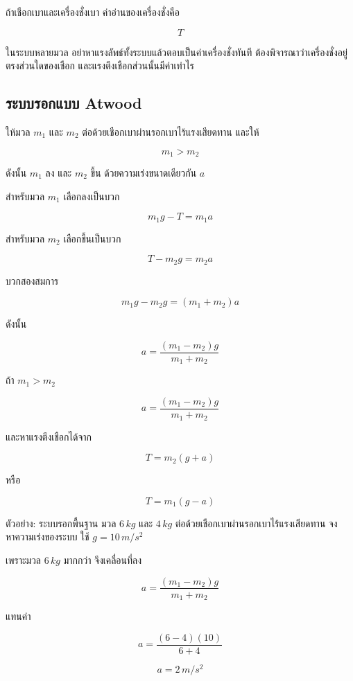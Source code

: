 ถ้าเชือกเบาและเครื่องชั่งเบา ค่าอ่านของเครื่องชั่งคือ

\[
T
\]

\begin{tcolorbox}[title=ข้อควรระวัง]
ในระบบหลายมวล อย่าหาแรงลัพธ์ทั้งระบบแล้วตอบเป็นค่าเครื่องชั่งทันที ต้องพิจารณาว่าเครื่องชั่งอยู่ตรงส่วนใดของเชือก และแรงตึงเชือกส่วนนั้นมีค่าเท่าไร
\end{tcolorbox}

\subsection{ระบบรอกแบบ Atwood}

ให้มวล $m_1$ และ $m_2$ ต่อด้วยเชือกเบาผ่านรอกเบาไร้แรงเสียดทาน และให้

\[
m_1>m_2
\]

ดังนั้น $m_1$ ลง และ $m_2$ ขึ้น ด้วยความเร่งขนาดเดียวกัน $a$

สำหรับมวล $m_1$ เลือกลงเป็นบวก

\[
m_1g-T=m_1a
\]

สำหรับมวล $m_2$ เลือกขึ้นเป็นบวก

\[
T-m_2g=m_2a
\]

บวกสองสมการ

\[
m_1g-m_2g=(m_1+m_2)a
\]

ดังนั้น

\[
a=\frac{(m_1-m_2)g}{m_1+m_2}
\]

\begin{tcolorbox}[title=Atwood machine]
ถ้า $m_1>m_2$

\[
a=\frac{(m_1-m_2)g}{m_1+m_2}
\]

และหาแรงตึงเชือกได้จาก

\[
T=m_2(g+a)
\]

หรือ

\[
T=m_1(g-a)
\]
\end{tcolorbox}

\begin{examplebox}{ตัวอย่าง: ระบบรอกพื้นฐาน}
มวล $6\,\si{kg}$ และ $4\,\si{kg}$ ต่อด้วยเชือกเบาผ่านรอกเบาไร้แรงเสียดทาน จงหาความเร่งของระบบ ใช้ $g=10\,\si{m/s^2}$

เพราะมวล $6\,\si{kg}$ มากกว่า จึงเคลื่อนที่ลง

\[
a=\frac{(m_1-m_2)g}{m_1+m_2}
\]

แทนค่า

\[
a=\frac{(6-4)(10)}{6+4}
\]

\[
a=2\,\si{m/s^2}
\]
\end{examplebox}

